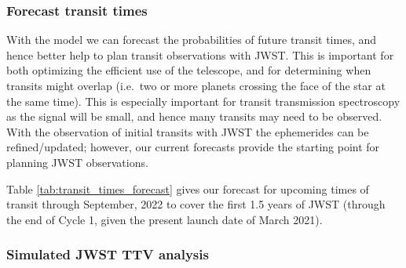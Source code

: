 \documentclass[twocolumn]{aastex63}
\begin{document}
%


\subsubsection{Forecast transit times}

With the model we can forecast the probabilities of future transit times,
and hence better help to plan transit observations with JWST.  This is
important for both optimizing the efficient use of the telescope, and for
determining when transits might overlap (i.e.\ two or more planets crossing the face
of the star at the same time).  This is especially important for transit
transmission spectroscopy as the signal will be small, and hence many 
transits may need to be observed.  With the observation of initial transits
with JWST the ephemerides can be refined/updated;  however, our current
forecasts provide the starting point for planning JWST observations.

Table \ref{tab:transit_times_forecast} gives our forecast for upcoming times of transit through September, 2022 to cover the first 1.5 years of JWST (through the end of Cycle 1, given the present launch date of March 2021).


\subsubsection{Simulated JWST TTV analysis}
\end{document}
